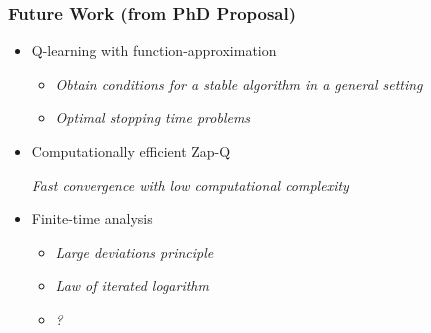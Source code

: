 \documentclass[xcolor=dvipsnames, subsection=false]{beamer}
\def\alertd#1{\alert{\color{blue}  #1}}
\def\alertg#1{\alert{\color{darkspringgreen}  #1}}
\begin{document}
\begin{frame}
\thispagestyle{empty}
\setcounter{framenumber}{0}
\frametitle{Future Work (from PhD Proposal)}
\begin{itemize}

\item
Q-learning with function-approximation

\begin{itemize}
\item
\textit{Obtain conditions for a stable algorithm in a general setting}
\medskip

\item
\alertd{\textit{Optimal stopping time problems}}
\end{itemize}
\medskip

\item 
Computationally efficient Zap-Q

\medskip

\textit{Fast convergence with low computational complexity}

\medskip
\item
Finite-time analysis

\begin{itemize}
\item 
{\textit{\alert{Large deviations principle}}}

\item
{\textit{\alertg{Law of iterated logarithm}}}

\item
\textit{\alertd{\LARGE  ?}}
\end{itemize}

\end{itemize}
\end{frame}
\end{document}
